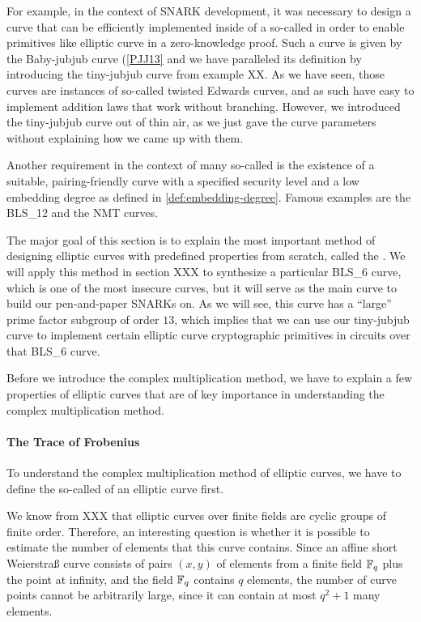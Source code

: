 For example, in the context of SNARK development, it was necessary to design a curve that can be efficiently implemented inside of a so-called  in order to enable primitives like elliptic curve  in a zero-knowledge proof. Such a curve is given by the Baby-jubjub curve (\ref{PJJ13} and we have paralleled its definition by introducing the tiny-jubjub curve from example XX.  As we have seen, those curves are instances of so-called twisted Edwards curves, and as such have easy to implement addition laws that work without branching. However, we introduced the tiny-jubjub curve out of thin air, as we just gave the curve parameters without explaining how we came up with them.

Another requirement in the context of many so-called  is the existence of a suitable, pairing-friendly curve with a specified security level and a low embedding degree as defined in \ref{def:embedding-degree}. Famous examples are the BLS\_12 and the NMT curves.

The major goal of this section is to explain the most important method of designing elliptic curves with predefined properties from scratch, called the . We will apply this method in section XXX to synthesize a particular BLS\_6 curve, which is one of the most insecure curves, but it will serve as the main curve to build our pen-and-paper SNARKs on. As we will see, this curve has a ``large'' prime factor subgroup of order $13$, which implies that we can use our tiny-jubjub curve to implement certain elliptic curve cryptographic primitives in circuits over that BLS\_6 curve. 
 
Before we introduce the complex multiplication method, we have to explain a few properties of elliptic curves that are of key importance in understanding the complex multiplication method. 

\paragraph{The Trace of Frobenius} To understand the complex multiplication method of elliptic curves, we have to define the so-called  of an elliptic curve first.

We know from XXX that elliptic curves over finite fields are cyclic groups of finite order. Therefore, an interesting question is whether it is possible to estimate the number of elements that this curve contains. Since an affine short Weierstraß curve consists of pairs $(x,y)$ of elements from a finite field $\mathbb{F}_q$ plus the point at infinity, and the field $\mathbb{F}_q$ contains $q$ elements, the number of curve points cannot be arbitrarily large, since it can contain at most $q^2+1$ many elements. 


